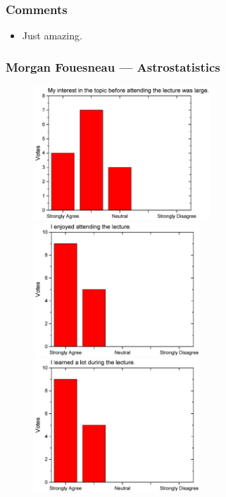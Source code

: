 \subsubsection*{Comments}
\begin{itemize}
\item Just amazing.
\end{itemize}
\newpage

\subsubsection{Morgan Fouesneau  --- Astrostatistics }
\begin{figure}[h!]
  \centering
  \begin{minipage}{.48\linewidth}
    \centering
      {\includegraphics[height=50mm]{figures/n/Graph71.pdf}}
      {\includegraphics[height=50mm]{figures/n/Graph72.pdf}}
      {\includegraphics[height=50mm]{figures/n/Graph73.pdf}}
  \end{minipage}\quad
  \begin{minipage}{.48\linewidth}

\end{minipage}
\end{figure}
